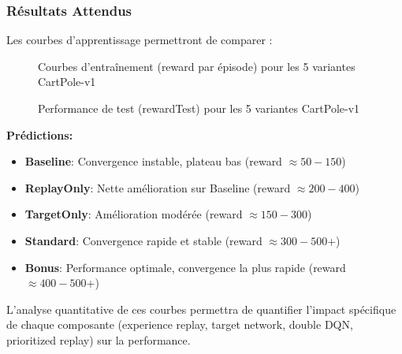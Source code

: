 \subsubsection{Résultats Attendus}

Les courbes d'apprentissage permettront de comparer :

\begin{figure}[h!]
    \centering
    \caption{Courbes d'entraînement (reward par épisode) pour les 5 variantes CartPole-v1}
\end{figure}

\begin{figure}[h!]
    \centering
    \caption{Performance de test (rewardTest) pour les 5 variantes CartPole-v1}
\end{figure}

\textbf{Prédictions:}
\begin{itemize}
    \item \textbf{Baseline}: Convergence instable, plateau bas (reward $\approx 50-150$)
    \item \textbf{ReplayOnly}: Nette amélioration sur Baseline (reward $\approx 200-400$)
    \item \textbf{TargetOnly}: Amélioration modérée (reward $\approx 150-300$)
    \item \textbf{Standard}: Convergence rapide et stable (reward $\approx 300-500$+)
    \item \textbf{Bonus}: Performance optimale, convergence la plus rapide (reward $\approx 400-500$+)
\end{itemize}

L'analyse quantitative de ces courbes permettra de quantifier l'impact spécifique de chaque composante
(experience replay, target network, double DQN, prioritized replay) sur la performance.
